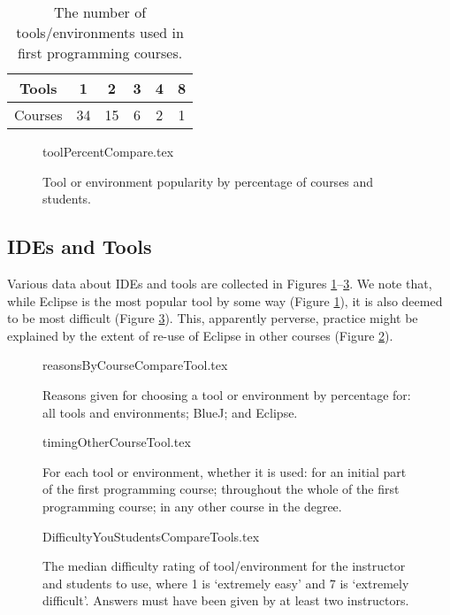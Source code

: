 \documentclass{sig-alternate}
\begin{document}
\begin{table}[]
\centering
\caption{The number of tools/environments used in first programming courses.}
\label{tab:numTools}
\begin{tabular}{cccccc}
\hline
Tools   & 1  & 2  & 3 & 4 & 8 \\ \hline
Courses & 34 & 15 & 6 & 2 & 1 \\ \hline
\end{tabular}
\end{table}

\begin{figure}
\begin{center}
{toolPercentCompare.tex}
\caption{Tool or environment popularity by percentage of courses and students.\label{fig:tools}}
\end{center}
\end{figure}

\subsection{IDEs and Tools}

Various data about IDEs and tools are collected in Figures
\ref{fig:tools}--\ref{fig:toolhard}. We note that, while Eclipse is
the most popular tool by some way (Figure \ref{fig:tools}), it is also
deemed to be most difficult (Figure \ref{fig:toolhard}). This,
apparently perverse, practice might be explained by the extent of
re-use of Eclipse in other courses (Figure \ref{fig:toolreuse}).

\begin{figure}
\begin{center}
{reasonsByCourseCompareTool.tex}
\end{center}
\caption{Reasons given for choosing a tool or environment by percentage for: all tools and environments; BlueJ; and Eclipse.}
\end{figure}

\begin{figure}
\begin{center}
{timingOtherCourseTool.tex}
\end{center}\vskip-18pt
\caption{For each tool or environment, whether it is used: for an initial part of the first programming course; throughout the whole of the first programming course; in any other course in the degree.\label{fig:toolreuse}}
\end{figure}


\begin{figure}
\begin{center}
{DifficultyYouStudentsCompareTools.tex}
\end{center}
\caption{The median difficulty rating of tool/environment for the instructor and students to use, where 1 is `extremely easy' and 7 is `extremely difficult'.  Answers must have been given by at least two instructors.\label{fig:toolhard}}
\end{figure}
\end{document}
